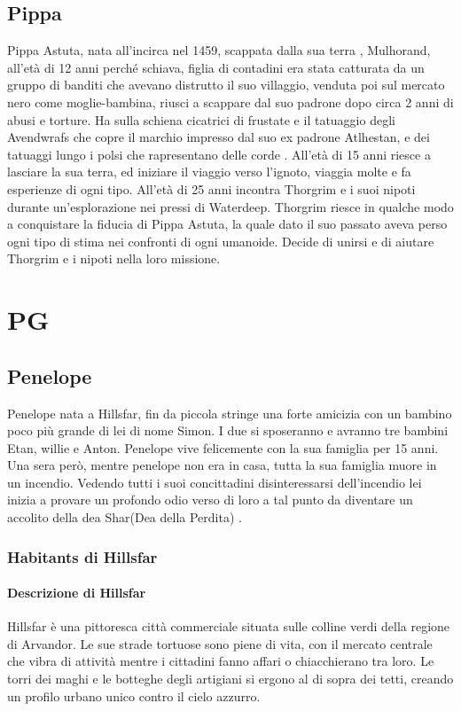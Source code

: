 \documentclass{article}
\begin{document}
\subsection{Pippa} Pippa Astuta, nata all'incirca nel 1459, scappata dalla sua terra , Mulhorand, all'età di 12 anni perché schiava, figlia di contadini era stata catturata da un gruppo di banditi che avevano distrutto il suo villaggio, venduta poi sul mercato nero come moglie-bambina, riusci a scappare dal suo padrone dopo circa 2 anni di abusi e torture. Ha sulla  schiena cicatrici di frustate e il tatuaggio degli Avendwrafs che copre il marchio impresso dal suo ex padrone Atlhestan, e dei tatuaggi lungo i polsi che rapresentano delle corde . All'età di 15 anni riesce a lasciare la sua terra, ed iniziare il viaggio verso l'ignoto, viaggia molte e fa esperienze di ogni tipo. All'età di 25 anni incontra Thorgrim e i suoi nipoti durante un'esplorazione nei pressi di Waterdeep. Thorgrim riesce in qualche modo a conquistare la fiducia di Pippa Astuta, la quale dato il suo passato aveva perso ogni tipo di stima nei confronti di ogni umanoide. Decide di unirsi e di aiutare Thorgrim e i nipoti nella loro missione.
\section{PG}
\subsection{Penelope}Penelope nata a Hillsfar, fin da piccola stringe una forte amicizia con un bambino poco più grande di lei di nome Simon. I due si sposeranno e avranno tre bambini Etan, willie e Anton.
Penelope vive felicemente con la sua famiglia per 15 anni. Una sera però, mentre penelope non era in casa, tutta la sua famiglia muore in un incendio. Vedendo tutti i suoi concittadini disinteressarsi dell’incendio lei inizia a provare un profondo odio verso di loro a tal punto da diventare un accolito della dea Shar(Dea della Perdita) .


\subsubsection*{Habitants di Hillsfar}

\paragraph*{Descrizione di Hillsfar}
Hillsfar è una pittoresca città commerciale situata sulle colline verdi della regione di Arvandor. Le sue strade tortuose sono piene di vita, con il mercato centrale che vibra di attività mentre i cittadini fanno affari o chiacchierano tra loro. Le torri dei maghi e le botteghe degli artigiani si ergono al di sopra dei tetti, creando un profilo urbano unico contro il cielo azzurro.
\end{document}
